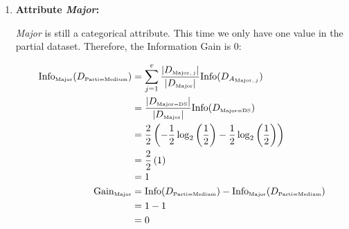 \documentclass[
english,
smallborders
]{i6prcsht}
\newcommand{\OfSpecificValue}[3]{_{\text{\tiny #1#2#3}}}
\newcommand{\OfAttribute}[1]{_{\text{\tiny #1}}}
\begin{document}
\begin{solution}
\begin{enumerate}
\begin{enumerate}
\begin{enumerate}
\begin{enumerate}
					                  \item \textbf{Attribute \textit{Major}:}
					                        
					                        \textit{Major} is still a categorical attribute. This time we only have one value in the partial dataset. Therefore, the Information Gain is $0$:
					                        
					                        \begin{alignat*}{2}
						                        \text{Info}\OfAttribute{Major}(D\OfSpecificValue{Parti}{=}{Medium}) & = \sum_{j=1}^v \frac{|D\OfAttribute{Major$,j$}|}{|D\OfAttribute{Major}|} \text{Info}(D_{A\OfAttribute{Major$,j$}})       \\
						                                                                                            & = \frac{|D\OfSpecificValue{Major}{=}{DS}|}{|D\OfAttribute{Major}|} \text{Info}(D\OfSpecificValue{Major}{=}{DS})          \\
						                                                                                            & = \frac{2}{2} \left(-\frac{1}{2} \log_2\left(\frac{1}{2}\right) - \frac{1}{2} \log_2\left(\frac{1}{2}\right)\right)      \\
						                                                                                            & = \frac{2}{2} \left(1\right)                                                                                             \\
						                                                                                            & = 1                                                                                                                      \\
						                        \text{Gain}\OfAttribute{Major}                                      & = \text{Info}(D\OfSpecificValue{Parti}{=}{Medium}) - \text{Info}\OfAttribute{Major}(D\OfSpecificValue{Parti}{=}{Medium}) \\
						                                                                                            & = 1 - 1                                                                                                                  \\
						                                                                                            & = 0                                                                                                                      \\
					                        \end{alignat*}
				                  \end{enumerate}
				                  

\end{enumerate}
\end{enumerate}
\end{enumerate}
\end{solution}
\end{document}

